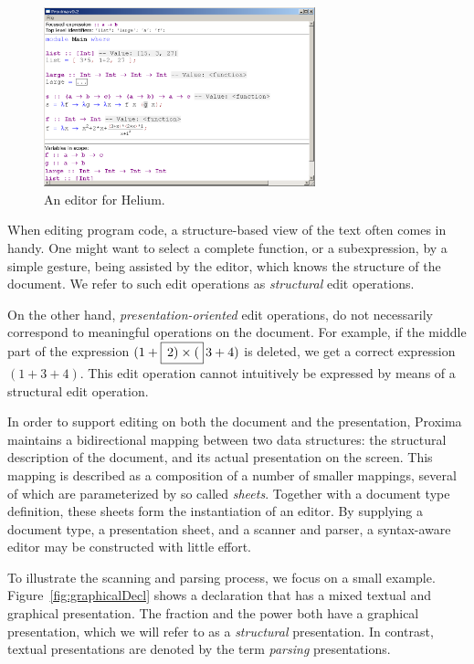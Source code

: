 \documentclass[12pt]{article}
\begin{document}
\begin{figure}[ht]
\centering
\includegraphics[width=0.7\textwidth]{images/HeliumEditor}
\caption{An editor for Helium.}
\label{fig:heliumEditor}
\end{figure}


When editing program code, a structure-based view of the text often comes in handy. One might want to select a complete  function, or a subexpression, by a simple gesture, being assisted by the editor, which knows the structure of the document. We refer to such edit operations as {\em structural} edit operations.

On the other hand, {\em presentation-oriented} edit operations, do not necessarily correspond to meaningful operations on the document. For example, if the middle part of the expression $(1+\framebox{$\,2) \times ($}\,3+4)$ is deleted, we get a correct expression $(1+3+4)$. This edit operation cannot intuitively be expressed by means of a structural edit operation.


In order to support editing on both the document and the presentation, Proxima maintains a bidirectional mapping between two data structures: the structural description of the document, and its actual presentation on the screen. This mapping is described as a composition of a number of smaller mappings, several of which are parameterized by so called {\em sheets}. Together with a document type definition, these sheets form the instantiation of an editor. By supplying a document type, a presentation sheet, and a scanner and parser, a syntax-aware editor may be constructed with little effort.



To illustrate the scanning and parsing process, we focus on a small example. Figure~\ref{fig:graphicalDecl} shows a declaration that has a mixed textual and graphical presentation. The fraction and the power both have a graphical presentation, which we will refer to as a {\em structural} presentation. In contrast, textual presentations are denoted by the term {\em parsing} presentations. 
\end{document}
